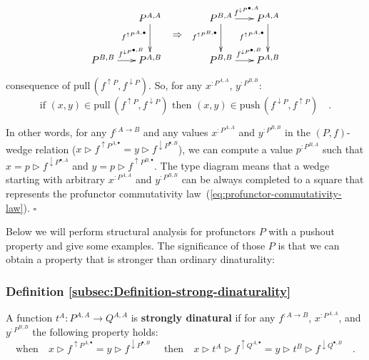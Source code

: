 \begin{wrapfigure}{l}{0.415\columnwidth}%
\vspace{-2.3\baselineskip}
\[
\xymatrix{\xyScaleY{2.3pc}\xyScaleX{1.5pc} & P^{A,A}\ar[d]\sb(0.4){f^{\uparrow P^{A,\bullet}}} & \ar@{}[d]\sb(0.4){\displaystyle \Rightarrow} & P^{B,A}\ar[r]\sp(0.55){f^{\downarrow P^{\bullet,A}}}\ar[d]\sb(0.4){f^{\uparrow P^{B,\bullet}}} & P^{A,A}\ar[d]\sb(0.4){f^{\uparrow P^{A,\bullet}}}\\
P^{B,B}\ar[r]\sp(0.6){f^{\downarrow P^{\bullet,B}}} & P^{A,B} &  & P^{B,B}\ar[r]\sp(0.6){f^{\downarrow P^{\bullet,B}}} & P^{A,B}
}
\]

\vspace{-1.7\baselineskip}
\end{wrapfigure}%

\noindent consequence of $\text{pull}\,(f^{\uparrow P},f^{\downarrow P})$.
So, for any $x^{:P^{A,A}}$, $y^{:P^{B,B}}$:
\[
\text{if }(x,y)\in\text{pull}\,(f^{\uparrow P},f^{\downarrow P})\text{ then }(x,y)\in\text{push}\,(f^{\downarrow P},f^{\uparrow P})\quad.
\]

\noindent In other words, for any $f^{:A\rightarrow B}$ and any values
$x^{:P^{A,A}}$ and $y^{:P^{B,B}}$ in the $\left(P,f\right)$-wedge
relation ($x\triangleright f^{\uparrow P^{A,\bullet}}=y\triangleright f^{\downarrow P^{\bullet,B}}$),
we can compute a value $p^{:P^{B,A}}$ such that $x=p\triangleright f^{\downarrow P^{\bullet,A}}$
and $y=p\triangleright f^{\uparrow P^{B,\bullet}}$. The type diagram
means that a wedge starting with arbitrary $x^{:P^{A,A}}$ and $y^{:P^{B,B}}$
can be always completed to a square that represents the profunctor
commutativity law~(\ref{eq:profunctor-commutativity-law}). $\square$

Below we will perform structural analysis for profunctors $P$ with
a pushout property and give some examples. The significance of those
$P$ is that we can obtain a property that is stronger than ordinary
dinaturality:

\subsubsection{Definition \label{subsec:Definition-strong-dinaturality}\ref{subsec:Definition-strong-dinaturality}}

A function $t^{A}:P^{A,A}\rightarrow Q^{A,A}$ is \textbf{strongly
dinatural} if for any $f^{:A\rightarrow B}$,
$x^{:P^{A,A}}$, and $y^{:P^{B,B}}$ the following property holds:\vspace{-0.3\baselineskip}
\begin{equation}
\text{when}\quad x\triangleright f^{\uparrow P^{A,\bullet}}=y\triangleright f^{\downarrow P^{\bullet,B}}\quad\text{ then}\quad x\triangleright t^{A}\triangleright f^{\uparrow Q^{A,\bullet}}=y\triangleright t^{B}\triangleright f^{\downarrow Q^{\bullet,B}}\quad.\label{eq:strong-dinaturality-law}
\end{equation}

